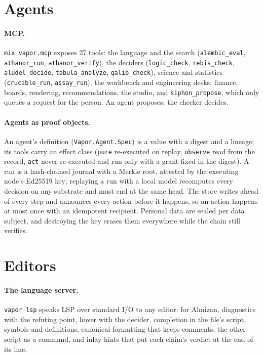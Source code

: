 \section{Agents}

\paragraph{MCP.} \texttt{mix vapor.mcp} exposes 27 tools: the language and the search
(\texttt{alembic\_eval}, \texttt{athanor\_run}, \texttt{athanor\_verify}), the deciders
(\texttt{logic\_check}, \texttt{rebis\_check}, \texttt{aludel\_decide}, \texttt{tabula\_analyze},
\texttt{qalib\_check}), science and statistics (\texttt{crucible\_run}, \texttt{assay\_run}), the
workbench and engineering desks, finance, boards, rendering, recommendations, the studio, and
\texttt{siphon\_propose}, which only queues a request for the person. An agent proposes; the checker
decides.

\paragraph{Agents as proof objects.} An agent's definition (\texttt{Vapor.Agent.Spec}) is a value with
a digest and a lineage; its tools carry an effect class (\texttt{pure} re-executed on replay,
\texttt{observe} read from the record, \texttt{act} never re-executed and run only with a grant fixed in
the digest). A run is a hash-chained journal with a Merkle root, attested by the executing node's
Ed25519 key; replaying a run with a local model recomputes every decision on any substrate and must end
at the same head. The store writes ahead of every step and announces every action before it happens, so
an action happens at most once with an idempotent recipient. Personal data are sealed per data subject,
and destroying the key erases them everywhere while the chain still verifies.

\section{Editors}

\paragraph{The language server.} \texttt{vapor lsp} speaks LSP over standard I/O to any editor: for
Almizan, diagnostics with the refuting point, hover with the decider, completion in the file's script,
symbols and definitions, canonical formatting that keeps comments, the other script as a command, and
inlay hints that put each claim's verdict at the end of its line.

